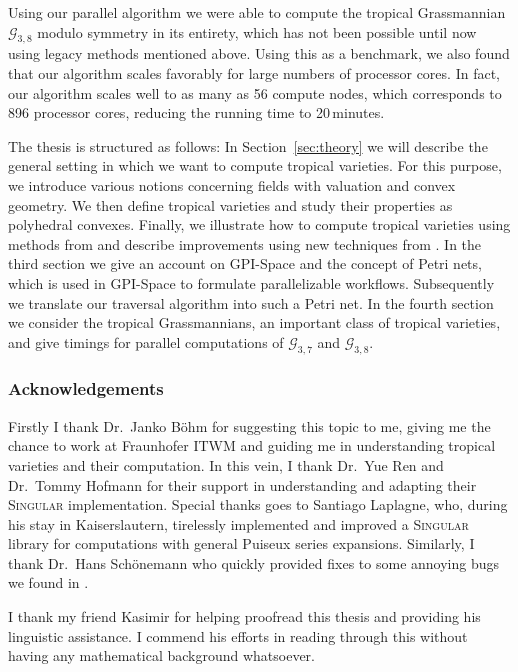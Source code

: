 \documentclass[
  paper=a4,
  titlepage,
  bibliography=totoc,
  pagesize=pdftex
]{scrartcl}
\numberwithin{figure}{section}
\numberwithin{equation}{section}
\numberwithin{table}{section}
\theoremstyle{definition}
\numberwithin{definition}{section}
\begin{document}
Using our parallel algorithm we were able to compute the tropical Grassmannian $\mathcal
G_{3,8}$ modulo symmetry in its entirety, which has not been possible until now using
legacy methods mentioned above. Using this as a benchmark, we also found that our
algorithm scales favorably for large numbers of processor cores. In fact, our algorithm
scales well to as many as 56 compute nodes, which corresponds to 896 processor cores,
reducing the running time to 20\,minutes.

The thesis is structured as follows: In Section~\ref{sec:theory} we will describe the
general setting in which we want to compute tropical varieties. For this purpose, we
introduce various notions concerning fields with valuation and convex geometry. We then
define tropical varieties and study their properties as polyhedral convexes. Finally, we
illustrate how to compute tropical varieties using methods from \cite{compTropVar} and
describe improvements using new techniques from \cite{tropPointsLinks}. In the third
section we give an account on GPI-Space and the concept of Petri nets, which is used in
GPI-Space to formulate parallelizable workflows. Subsequently we translate our traversal
algorithm into such a Petri net. In the fourth section we consider the tropical
Grassmannians, an important class of tropical varieties, and give timings for parallel
computations of $\mathcal G_{3,7}$ and $\mathcal G_{3,8}$.

\subsubsection*{Acknowledgements}
Firstly I thank Dr.~Janko Böhm for suggesting this topic to me, giving me
the chance to work at Fraunhofer ITWM and guiding me in understanding tropical varieties
and their computation. In this vein, I thank Dr.~Yue Ren and Dr.~Tommy Hofmann for their
support in understanding and adapting their \textsc{Singular} implementation. Special
thanks goes to Santiago Laplagne, who, during his stay in Kaiserslautern, tirelessly
implemented and improved a \textsc{Singular} library for computations with general Puiseux
series expansions. Similarly, I thank Dr.~Hans Schönemann who quickly provided
fixes to some annoying bugs we found in .

I thank my friend Kasimir for helping proofread this thesis and providing his
linguistic assistance. I commend his efforts in reading through this without having any
mathematical background whatsoever.
\end{document}
